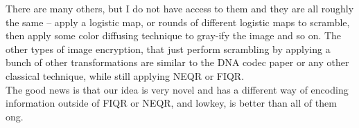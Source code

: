 \documentclass[svgnames]{article}     %
\begin{document}
There are many others, but I do not have access to them and they are all
roughly the same -- apply a logistic map, or rounds of different logistic maps
to scramble, then apply some color diffusing technique to gray-ify the image
and so on. The other types of image encryption, that just perform scrambling by
applying a bunch of other transformations are similar to the DNA codec paper or any other
classical technique, while still applying NEQR or FIQR. \\

The good news is that our idea is very novel and has a different way of encoding
information outside of FIQR or NEQR, and lowkey, is better than all of
them ong. 
\end{document}
